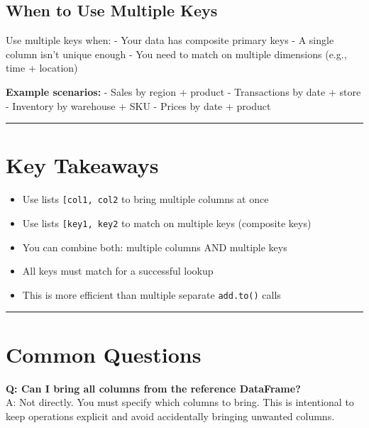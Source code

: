 \documentclass[
  letterpaper,
]{scrbook}
\providecommand{\tightlist}{%
  \setlength{\itemsep}{0pt}\setlength{\parskip}{0pt}}
\begin{document}
\subsection{When to Use Multiple Keys}\label{when-to-use-multiple-keys}

Use multiple keys when: - Your data has composite primary keys - A
single column isn't unique enough - You need to match on multiple
dimensions (e.g., time + location)

\textbf{Example scenarios:} - Sales by region + product - Transactions
by date + store - Inventory by warehouse + SKU - Prices by date +
product

\begin{center}\rule{0.5\linewidth}{0.5pt}\end{center}

\section{Key Takeaways}\label{key-takeaways-1}

\begin{itemize}
\tightlist
\item
  Use lists
  \texttt{{[}\textquotesingle{}col1\textquotesingle{},\ \textquotesingle{}col2\textquotesingle{}{]}}
  to bring multiple columns at once
\item
  Use lists
  \texttt{{[}\textquotesingle{}key1\textquotesingle{},\ \textquotesingle{}key2\textquotesingle{}{]}}
  to match on multiple keys (composite keys)
\item
  You can combine both: multiple columns AND multiple keys
\item
  All keys must match for a successful lookup
\item
  This is more efficient than multiple separate \texttt{add.to()} calls
\end{itemize}

\begin{center}\rule{0.5\linewidth}{0.5pt}\end{center}

\section{Common Questions}\label{common-questions-1}

\textbf{Q: Can I bring all columns from the reference DataFrame?}\\
A: Not directly. You must specify which columns to bring. This is
intentional to keep operations explicit and avoid accidentally bringing
unwanted columns.
\end{document}
